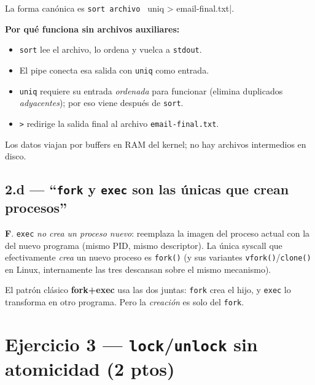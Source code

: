 \documentclass[11pt,a4paper]{article}
\begin{document}
\begin{respuesta}
La forma canónica es \verb|sort archivo | uniq > email-final.txt|.

\textbf{Por qué funciona sin archivos auxiliares:}

\begin{itemize}[leftmargin=*,nosep]
    \item \texttt{sort} lee el archivo, lo ordena y vuelca a
        \texttt{stdout}.
    \item El pipe conecta esa salida con \texttt{uniq} como entrada.
    \item \texttt{uniq} requiere su entrada \emph{ordenada} para
        funcionar (elimina duplicados \emph{adyacentes}); por eso
        viene después de \texttt{sort}.
    \item \texttt{>} redirige la salida final al archivo
        \texttt{email-final.txt}.
\end{itemize}

Los datos viajan por buffers en RAM del kernel; no hay archivos
intermedios en disco.
\end{respuesta}

\subsection*{2.d --- ``\texttt{fork} y \texttt{exec} son las únicas que crean procesos''}

\begin{respuesta}
\textbf{F}. \texttt{exec} \emph{no crea un proceso nuevo}: reemplaza
la imagen del proceso actual con la del nuevo programa (mismo PID,
mismo descriptor). La única syscall que efectivamente \emph{crea} un
nuevo proceso es \texttt{fork()} (y sus variantes
\texttt{vfork()}/\texttt{clone()} en Linux, internamente las tres
descansan sobre el mismo mecanismo).

El patrón clásico \textbf{fork+exec} usa las dos juntas: \texttt{fork}
crea el hijo, y \texttt{exec} lo transforma en otro programa. Pero la
\emph{creación} es solo del \texttt{fork}.
\end{respuesta}

\section{Ejercicio 3 --- \texttt{lock}/\texttt{unlock} sin atomicidad (2 ptos)}
\end{document}
